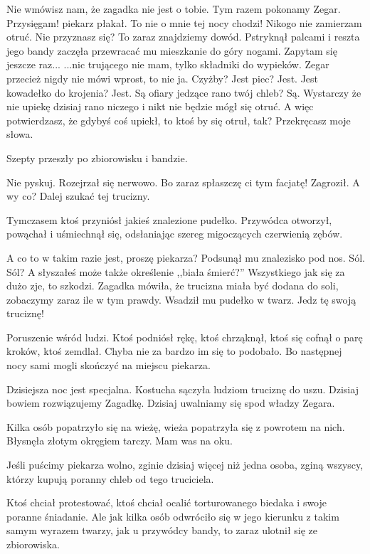 \begin{dialogue}		
	\ds{} Nie wmówisz nam, że zagadka nie jest o tobie. Tym razem pokonamy Zegar.
	\ds{} Przysięgam! \dm{} 
		piekarz płakał. \dm{} 
		To nie o mnie tej nocy chodzi! Nikogo nie zamierzam otruć.
	\ds{} Nie przyznasz się? To zaraz znajdziemy dowód. \dm{} 
		Pstryknął palcami i reszta jego bandy zaczęła przewracać mu mieszkanie do góry nogami. \ds{} 
		Zapytam się jeszcze raz...
	\ds{} ...nic trującego nie mam, tylko składniki do wypieków. Zegar przecież nigdy nie mówi wprost, to nie ja.
	\ds{} Czyżby? Jest piec? Jest. Jest kowadełko do krojenia? Jest. Są ofiary jedzące rano twój chleb? Są.
	\ds{} Wystarczy że nie upiekę dzisiaj rano niczego i nikt nie będzie mógł się otruć.
	\ds{} A więc potwierdzasz, że gdybyś coś upiekł, to ktoś by się otruł, tak?
	\ds{} Przekręcasz moje słowa.
\end{dialogue}
Szepty przeszły po zbiorowisku i bandzie.
\begin{dialogue}
	\ds{} Nie pyskuj. \dm{} 
		Rozejrzał się nerwowo. \dm{} 
		Bo zaraz spłaszczę ci tym facjatę! \dm{} 
		Zagroził. \dm{} 
		A wy co? Dalej szukać tej trucizny.
\end{dialogue}
Tymczasem ktoś przyniósł jakieś znalezione pudełko.
Przywódca otworzył, powąchał i uśmiechnął się, odsłaniając szereg migoczących czerwienią zębów.
\begin{dialogue}
	\ds{} A co to w takim razie jest, proszę piekarza? \dm{} Podsunął mu znalezisko pod nos.
	\ds{} Sól.
	\ds{} Sól? A słyszałeś może także określenie ,,biała śmierć?''
	\ds{} Wszystkiego jak się za dużo zje, to szkodzi.
	\ds{} Zagadka mówiła, że trucizna miała być dodana do soli, zobaczymy zaraz ile w tym prawdy. \dm{} Wsadził mu pudełko w twarz. \dm{} Jedz tę swoją truciznę!
\end{dialogue}
Poruszenie wśród ludzi.
Ktoś podniósł rękę, ktoś chrząknął, ktoś się cofnął o parę kroków, ktoś zemdlał.
Chyba nie za bardzo im się to podobało. Bo następnej nocy sami mogli skończyć na miejscu piekarza.
\begin{dialogue}
	\ds{} Dzisiejsza noc jest specjalna. 
		\dm{} Kostucha sączyła ludziom truciznę do uszu. 
		\dm{} Dzisiaj bowiem rozwiązujemy Zagadkę. Dzisiaj uwalniamy się spod władzy Zegara.
\end{dialogue}
Kilka osób popatrzyło się na wieżę, wieża popatrzyła się z powrotem na nich. Błysnęła złotym okręgiem tarczy. Mam was na oku.
\begin{dialogue}
	\ds{} Jeśli puścimy piekarza wolno, zginie dzisiaj więcej niż jedna osoba, zginą wszyscy, którzy kupują poranny chleb od tego truciciela.
\end{dialogue}
Ktoś chciał protestować, ktoś chciał ocalić torturowanego biedaka i swoje poranne śniadanie.
Ale jak kilka osób odwróciło się w jego kierunku z takim samym wyrazem twarzy, jak u przywódcy bandy, to zaraz ulotnił się ze zbiorowiska.

